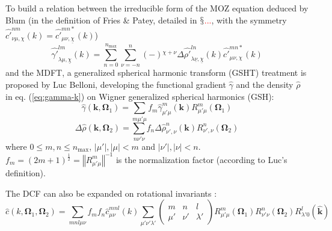 To build a relation between the irreducible form of the \acs{MOZ}
equation deduced by Blum (in the definition of Fries \& Patey, detailed
in $\mathsection$\textcolor{red}{...}, with the symmetry $\hat{c'}_{\nu\mu,\chi}^{nm}(k)=\hat{c'}_{\mu\nu,\underline{\chi}}^{mn*}(k)$)
\begin{equation}
\hat{\gamma'}_{\lambda\mu,\underline{\chi}}^{lm}(k)=\sum_{n=0}^{n_{\mathrm{max}}}\sum_{\nu=-n}^{n}\left(-\right){}^{\chi+\nu}\Delta\hat{\rho'}_{\lambda\underline{\nu},\underline{\chi}}^{ln}(k)\hat{c'}_{\mu\nu,\chi}^{mn*}(k)\label{eq:Blum-reduced-OZ}
\end{equation}
and the \acs{MDFT}, a generalized spherical harmonic transform (\acs{GSHT})
treatment is proposed by Luc Belloni, developing the functional gradient
$\hat{\gamma}$ and the density $\hat{\rho}$ in eq. (\ref{eq:gamma-k})
on Wigner generalized spherical harmonics (\acs{GSH}):
\begin{equation}
\hat{\gamma}(\mathbf{k},\mathbf{\Omega}_{1})=\sum_{m\mu'\mu}f_{m}\hat{\gamma}_{\mu'\mu}^{m}(\mathbf{k})R_{\mu'\mu}^{m}(\mathbf{\Omega}_{1})\label{eq:gamma-projection}
\end{equation}
\begin{equation}
\Delta\hat{\rho}(\mathbf{k},\mathbf{\Omega}_{2})=\sum_{n\nu'\nu}f_{n}\Delta\hat{\rho}_{\nu',\nu}^{n}(\mathbf{k})R_{\nu',\nu}^{n}(\mathbf{\Omega}_{2})\label{eq:delta-rho-projection}
\end{equation}
where $0\leq m,n\leq n_{\mathrm{max}}$, $\left|\mu'\right|,\left|\mu\right|<m$
and $\left|\nu'\right|,\left|\nu\right|<n$. $f_{m}=\left(2m+1\right)^{\frac{1}{2}}=\left\Vert R_{\mu'\mu}^{m}\right\Vert ^{-1}$
is the normalization factor (according to Luc's definition).

The \acs{DCF} can also be expanded on rotational invariants \citep{Fries_Patey_1985}:
\begin{equation}
\hat{c}(k,\mathbf{\Omega}_{1},\mathbf{\Omega}_{2})=\sum_{mnl\mu\nu}f_{m}f_{n}\hat{c}_{\mu\nu}^{mnl}(k)\sum_{\mu'\nu'\lambda'}\left(\begin{array}{ccc}
m & n & l\\
\mu' & \nu' & \lambda'
\end{array}\right)R_{\mu'\mu}^{m}(\mathbf{\Omega}_{1})R_{\nu'\nu}^{n}(\mathbf{\Omega}_{2})R_{\lambda'0}^{l}(\hat{\mathbf{k}})\label{eq:c-projection}
\end{equation}

